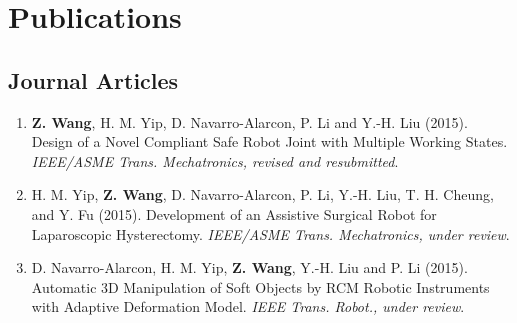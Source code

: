 \documentclass[10pt,letterpaper]{article}
\begin{document}
\section*{Publications}

\subsection*{Journal Articles}
\begin{enumerate}
\item \textbf{Z. Wang}, H. M. Yip, D. Navarro-Alarcon, P. Li and Y.-H. Liu (2015).
  Design of a Novel Compliant Safe Robot Joint with Multiple Working States.
  \textit{{IEEE/ASME} Trans. Mechatronics, revised and resubmitted}.
\item H. M. Yip, \textbf{Z. Wang}, D. Navarro-Alarcon, P. Li, Y.-H. Liu, T. H. Cheung, and Y. Fu (2015).
  Development of an Assistive Surgical Robot for Laparoscopic Hysterectomy.
  \textit{{IEEE/ASME} Trans. Mechatronics, under review}.
\item D. Navarro-Alarcon, H. M. Yip, \textbf{Z. Wang}, Y.-H. Liu and P. Li (2015).
  Automatic 3D Manipulation of Soft Objects by RCM Robotic Instruments with Adaptive Deformation Model.
  \textit{{IEEE} Trans. Robot., under review}.
\end{enumerate}
\end{document}
